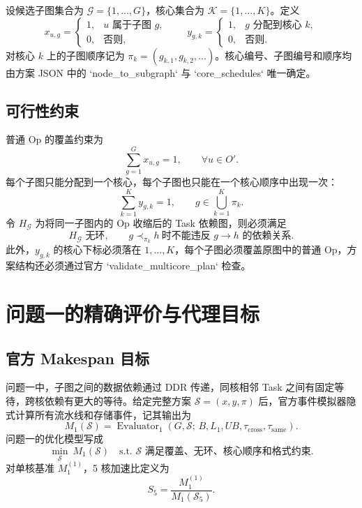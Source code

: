 设候选子图集合为 $\mathcal G=\{1,\ldots,G\}$，核心集合为 $\mathcal K=\{1,\ldots,K\}$。定义
\begin{equation}
x_{u,g}=\begin{cases}1,&u\text{ 属于子图 }g,\\0,&\text{否则},\end{cases}
\qquad
y_{g,k}=\begin{cases}1,&g\text{ 分配到核心 }k,\\0,&\text{否则}.
\end{cases}
\end{equation}
对核心 $k$ 上的子图顺序记为 $\pi_k=(g_{k,1},g_{k,2},\ldots)$。核心编号、子图编号和顺序均由方案 JSON 中的 `node\_to\_subgraph` 与 `core\_schedules` 唯一确定。

\subsection{可行性约束}

普通 Op 的覆盖约束为
\begin{equation}
\sum_{g=1}^{G}x_{u,g}=1,\qquad \forall u\in O'.
\end{equation}
每个子图只能分配到一个核心，每个子图也只能在一个核心顺序中出现一次：
\begin{equation}
\sum_{k=1}^{K}y_{g,k}=1,\qquad
g\in\bigcup_{k=1}^{K}\pi_k .
\end{equation}
令 $H_{\mathcal G}$ 为将同一子图内的 Op 收缩后的 Task 依赖图，则必须满足
\begin{equation}
H_{\mathcal G}\text{ 无环},
\qquad
g\prec_{\pi_k}h\ \text{时不能违反 }g\to h\text{ 的依赖关系}.
\end{equation}
此外，$y_{g,k}$ 的核心下标必须落在 $1,\ldots,K$，每个子图必须覆盖原图中的普通 Op，方案结构还必须通过官方 `validate\_multicore\_plan` 检查。

\section{问题一的精确评价与代理目标}

\subsection{官方 Makespan 目标}

问题一中，子图之间的数据依赖通过 DDR 传递，同核相邻 Task 之间有固定等待，跨核依赖有更大的等待。给定完整方案 $\mathcal S=(x,y,\pi)$ 后，官方事件模拟器隐式计算所有流水线和存储事件，记其输出为
\begin{equation}
M_1(\mathcal S)=\operatorname{Evaluator}_1(G,\mathcal S;\,B,L_1,UB,\tau_{\mathrm{cross}},\tau_{\mathrm{same}}).
\end{equation}
问题一的优化模型写成
\begin{equation}
\min_{\mathcal S}\ M_1(\mathcal S)\quad
\text{s.t. }\mathcal S\text{ 满足覆盖、无环、核心顺序和格式约束}.
\end{equation}
对单核基准 $M_1^{(1)}$，5 核加速比定义为
\begin{equation}
S_5=\frac{M_1^{(1)}}{M_1(\mathcal S_5)}.
\end{equation}

